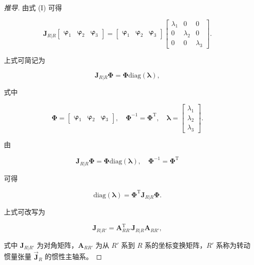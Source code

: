 \begin{proof}[推导]
由式 (I) 可得

\[
\boldsymbol{J}_{R|R} \begin{bmatrix} \boldsymbol{\varphi}_1 & \boldsymbol{\varphi}_2 & \boldsymbol{\varphi}_3 \end{bmatrix} = \begin{bmatrix} \boldsymbol{\varphi}_1 & \boldsymbol{\varphi}_2 & \boldsymbol{\varphi}_3 \end{bmatrix} \begin{bmatrix} \lambda_1 & 0 & 0 \\ 0 & \lambda_2 & 0 \\ 0 & 0 & \lambda_3 \end{bmatrix}.
\]

上式可简记为

\[
\boldsymbol{J}_{R|R} \boldsymbol{\Phi} = \boldsymbol{\Phi} \mathrm{diag}(\boldsymbol{\lambda}),
\]

式中

\[
\boldsymbol{\Phi} = \begin{bmatrix} \boldsymbol{\varphi}_1 & \boldsymbol{\varphi}_2 & \boldsymbol{\varphi}_3 \end{bmatrix}, \quad \boldsymbol{\Phi}^{-1} = \boldsymbol{\Phi}^{\mathrm{T}}, \quad \boldsymbol{\lambda} = \begin{bmatrix} \lambda_1 \\ \lambda_2 \\ \lambda_3 \end{bmatrix}.
\]

由

\[
\boldsymbol{J}_{R|R} \boldsymbol{\Phi} = \boldsymbol{\Phi} \mathrm{diag}(\boldsymbol{\lambda}), \quad \boldsymbol{\Phi}^{-1} = \boldsymbol{\Phi}^{\mathrm{T}}
\]

可得

\[
\mathrm{diag}(\boldsymbol{\lambda}) = \boldsymbol{\Phi}^{\mathrm{T}} \boldsymbol{J}_{R|R} \boldsymbol{\Phi}.
\]

上式可改写为

\[
\boldsymbol{J}_{R|R'} = \boldsymbol{A}_{RR'}^{\mathrm{T}} \boldsymbol{J}_{R|R} \boldsymbol{A}_{RR'},
\]

式中 $\boldsymbol{J}_{R|R'}$ 为对角矩阵，$\boldsymbol{A}_{RR'}$ 为从 $R'$ 系到 $R$ 系的坐标变换矩阵，$R'$ 系称为转动惯量张量 $\vec{\boldsymbol{J}}_R$ 的惯性主轴系。
\end{proof}
